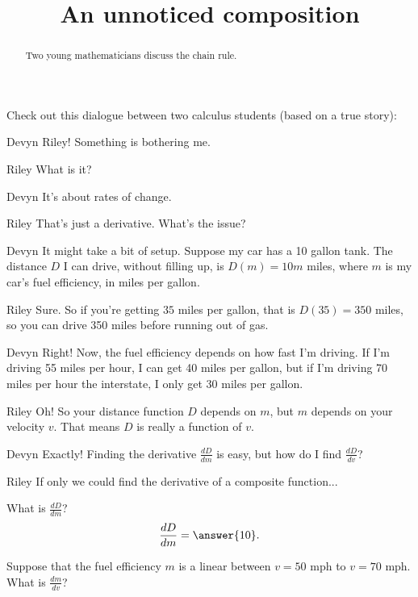 \documentclass{ximera}
\title[Break-Ground:]{An unnoticed composition}
\begin{document}
\begin{abstract}
Two young mathematicians discuss the chain rule.
\end{abstract}
\maketitle

Check out this dialogue between two calculus students (based on a true
story):

\begin{dialogue}
\item[Devyn] Riley! Something is bothering me. 
\item[Riley] What is it?
\item[Devyn]  It's about rates of change.
\item[Riley] That's just a derivative.  What's the issue?
\item[Devyn]  It might take a bit of setup.  Suppose my car has a 10 gallon tank.  The distance $D$ I can drive, without filling up, is $D(m)=10m$ miles, where $m$ is my car's fuel
			efficiency, in miles per gallon.
\item[Riley]  Sure.  So if you're getting $35$ miles per gallon, that is $D(35) = 350$ miles, so you can drive 350 miles before running out of gas.
\item[Devyn] Right!  Now, the fuel efficiency depends on how fast I'm driving.  If I'm driving 55 miles per hour, I can get 40 miles per gallon, but if I'm driving 70 miles per hour the interstate,
			I only get 30 miles per gallon.
\item[Riley]  Oh!  So your distance function $D$ depends on $m$, but $m$ depends on your velocity $v$.  That means $D$ is really a function of $v$.
\item[Devyn]  Exactly!  Finding the derivative $\frac{dD}{dm}$ is easy, but how do I find $\frac{dD}{dv}$?
\item[Riley]  If only we could find the derivative of a composite function...
\end{dialogue}



\begin{question}
	What is $\frac{dD}{dm}$?
	\[ \frac{dD}{dm} = \answer{10}. \]
\end{question}

\begin{question}
	Suppose that the fuel efficiency $m$ is a linear between $v = 50$ mph to $v= 70$ mph.  What is $\frac{dm}{dv}$?
	\begin{multipleChoice}
	\end{multipleChoice}
\end{question}

%
\end{document}
